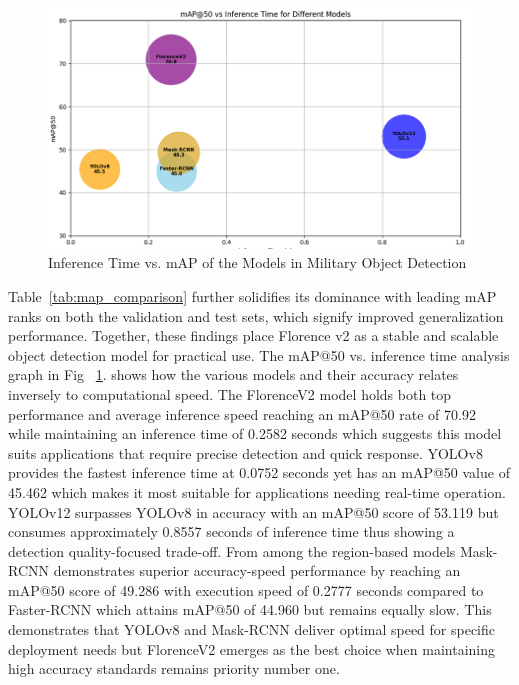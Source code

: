 \documentclass[fleqn,10pt,lineno]{wlpeerj}
\begin{document}
\begin{figure} [H]
    \centering
    \includegraphics[width=1\linewidth]{compare.png}
    \caption{Inference Time vs. mAP of the Models in Military Object Detection}
    \label{fig:inference}
\end{figure}

Table~\ref{tab:map_comparison} further solidifies its dominance with leading mAP ranks on both the validation and test sets, which signify improved generalization performance. Together, these findings place Florence v2 as a stable and scalable object detection model for practical use.
The mAP@50 vs. inference time analysis graph in Fig ~\ref{fig:inference}. shows how the various models and their accuracy relates inversely to computational speed. The FlorenceV2 model holds both top performance and average inference speed reaching an mAP@50 rate of 70.92 while maintaining an inference time of 0.2582 seconds which suggests this model suits applications that require precise detection and quick response. YOLOv8 provides the fastest inference time at 0.0752 seconds yet has an mAP@50 value of 45.462 which makes it most suitable for applications needing real-time operation. YOLOv12 surpasses YOLOv8 in accuracy with an mAP@50 score of 53.119 but consumes approximately 0.8557 seconds of inference time thus showing a detection quality-focused trade-off. From among the region-based models Mask-RCNN demonstrates superior accuracy-speed performance by reaching an mAP@50 score of 49.286 with execution speed of 0.2777 seconds compared to Faster-RCNN which attains mAP@50 of 44.960 but remains equally slow. This demonstrates that YOLOv8 and Mask-RCNN deliver optimal speed for specific deployment needs but FlorenceV2 emerges as the best choice when maintaining high accuracy standards remains priority number one.
\end{document}
